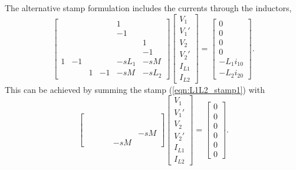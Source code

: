 \documentclass[a4paper, 12pt]{article}
\newcommand{\refeqn}[1]{\mbox{(\ref{eqn:#1})}}
\begin{document}
The alternative stamp formulation includes the currents through the
inductors,
%
\begin{equation}
  \begin{bmatrix}
     &  &  &    &  1 & \\
     &  &  &    & -1 & \\
     &  &  &    &    & 1\\
     &  &  &    &    & -1\\
1 & -1  &  &    & -sL_1 & -sM\\
     &  & 1 & -1 & -sM & -sL_2
  \end{bmatrix}
  \begin{bmatrix}
    V_1 \\ V_1' \\ V_2 \\ V_2' \\ I_{L1} \\ I_{L2}
  \end{bmatrix}
=
\begin{bmatrix}
  0 \\ 0 \\ 0 \\ 0 \\ -L_1 i_{10} \\ -L_2 i_{20}
\end{bmatrix}.
\end{equation}
%
This can be achieved by summing the stamp \refeqn{L1L2_stamp1} with
%
\begin{equation}
  \begin{bmatrix}
     &  &  &    &    & \\
     &  &  &    &    & \\
     &  &  &    &    & \\
     &  &  &    &    & \\
     &  &  &    &    & -sM\\
     &  &  &    & -sM & 
  \end{bmatrix}
  \begin{bmatrix}
    V_1 \\ V_1' \\ V_2 \\ V_2' \\ I_{L1} \\ I_{L2}
  \end{bmatrix}
=
\begin{bmatrix}
  0 \\ 0 \\ 0 \\ 0 \\ 0 \\ 0
\end{bmatrix}.
\end{equation}
\end{document}
